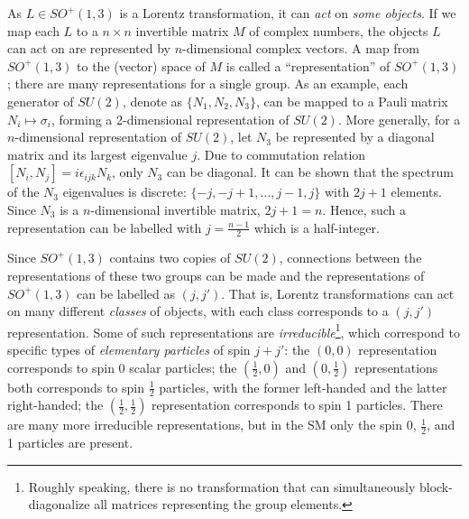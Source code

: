 As $L \in SO^+(1, 3)$ is a Lorentz transformation,
it can \emph{act} on \emph{some objects}.
If we map each $L$ to a $n \times n$ invertible matrix $M$ of complex numbers,
the objects $L$ can act on are represented by $n$-dimensional complex vectors.
A map from $SO^+(1, 3)$ to the (vector) space of $M$ is called a
``representation'' of $SO^+(1, 3)$;
there are many representations for a single group.
As an example, each generator of $SU(2)$,
denote as $\{N_1, N_2, N_3\}$,
can be mapped to a Pauli matrix $N_i \mapsto \sigma_i$,
forming a 2-dimensional representation of $SU(2)$.
More generally,
for a $n$-dimensional representation of $SU(2)$,
let $N_3$ be represented by a diagonal matrix and its largest eigenvalue $j$.
Due to commutation relation $[N_i, N_j] = i \epsilon_{ijk} N_k$,
only $N_3$ can be diagonal.
It can be shown that the spectrum of the $N_3$ eigenvalues is discrete:
$\{ -j, -j+1, \dots, j-1, j\}$ with $2j + 1$ elements.
Since $N_3$ is a $n$-dimensional invertible matrix, $2j + 1 = n$.
Hence, such a representation can be labelled with $j = \frac{n - 1}{2}$
which is a half-integer.

Since $SO^+(1, 3)$ contains two copies of $SU(2)$,
connections between the representations of these two groups can be made
and the representations of $SO^+(1, 3)$ can be labelled as $(j, j')$.
That is, Lorentz transformations can act on many different
\emph{classes} of objects,
with each class corresponds to a $(j, j')$ representation.
Some of such representations are \emph{irreducible}\footnote{
    Roughly speaking, there is no transformation that can simultaneously
    block-diagonalize all matrices representing the group elements.
},
which correspond to specific types of \emph{elementary particles}
of spin $j + j'$:
the $(0, 0)$ representation corresponds to spin 0 scalar particles;
the $(\frac{1}{2}, 0)$ and $(0, \frac{1}{2})$ representations both corresponds
to spin $\frac{1}{2}$ particles,
with the former left-handed and the latter right-handed;
the $(\frac{1}{2}, \frac{1}{2})$
representation corresponds to spin 1 particles.
There are many more irreducible representations,
but in the SM only the spin 0, $\frac{1}{2}$, and 1 particles are present.

